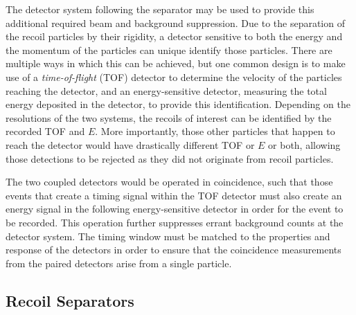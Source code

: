 The detector system following the separator may be used to provide this
additional required beam and background suppression. Due to the separation of
the recoil particles by their rigidity, a detector sensitive to both the energy
and the momentum of the particles can unique identify those particles. There
are multiple ways in which this can be achieved, but one common design is to
make use of a \textit{time-of-flight} (TOF) detector to determine the velocity of the
particles reaching the detector, and an energy-sensitive detector, measuring
the total energy deposited in the detector, to provide this identification.
Depending on the resolutions of the two systems, the recoils of interest can
be identified by the recorded TOF and $E$. More importantly, those other
particles that happen to reach the detector would have drastically different
TOF or $E$ or both, allowing those detections to be rejected as they did not
originate from recoil particles.

The two coupled detectors would be operated in coincidence, such that those
events that create a timing signal within the TOF detector must also create an
energy signal in the following energy-sensitive detector in order for the
event to be recorded. This operation further suppresses errant background
counts at the detector system. The timing window must be matched to the
properties and response of the detectors in order to ensure that the
coincidence measurements from the paired detectors arise from a single
particle.


\subsection{Recoil Separators}
\label{sec:prevwork}


